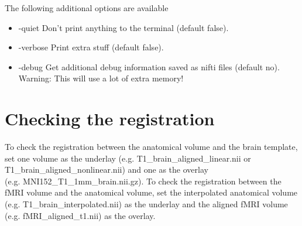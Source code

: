 The following additional options are available

\begin{itemize}

\item -quiet
\newline \newline Don't print anything to the terminal (default false). 

\item -verbose
\newline \newline Print extra stuff (default false).

\item -debug
\newline \newline Get additional debug information saved as nifti files (default no). Warning: This will use a lot of extra memory! 

\end{itemize}

\section{Checking the registration}

To check the registration between the anatomical volume and the brain template, set one volume as the underlay (e.g. T1\_brain\_aligned\_linear.nii or T1\_brain\_aligned\_nonlinear.nii) and one as the overlay \\ (e.g. MNI152\_T1\_1mm\_brain.nii.gz). To check the registration between the fMRI volume and the anatomical volume, set the interpolated anatomical volume (e.g. T1\_brain\_interpolated.nii) as the underlay and the aligned fMRI volume (e.g. fMRI\_aligned\_t1.nii) as the overlay.








